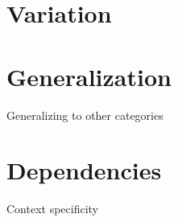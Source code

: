 \citet{Trude2012}

\section{Variation}

\citet{Sumner2011}

\section{Generalization}

Generalizing to other categories

\citet{Kraljic2006}

\citet{Reinisch2014}


\section{Dependencies}

Context specificity

\citet{Kraljic2008a}

\citet{Kraljic2008}

\citet{Reinisch2011}

\citet{Clare2014}
